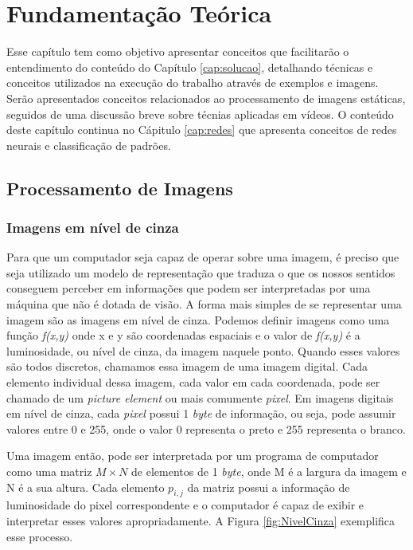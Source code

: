 \chapter{Fundamentação Teórica}\label{cap:fundament}



Esse capítulo tem como objetivo apresentar conceitos que facilitarão o entendimento do conteúdo do Capítulo \ref{cap:solucao}, detalhando técnicas e conceitos utilizados na execução do trabalho através de exemplos e imagens. Serão apresentados conceitos relacionados ao processamento de imagens estáticas, seguidos de uma discussão breve sobre técnias aplicadas em vídeos. O conteúdo deste capítulo continua no Cápitulo \ref{cap:redes} que apresenta conceitos de redes neurais e classificação de padrões. 

\section{Processamento de Imagens}\label{sec:processamento}

\subsection{Imagens em nível de cinza}

Para que um computador seja capaz de operar sobre uma imagem, é preciso que seja utilizado um modelo de representação que traduza o que os nossos sentidos conseguem perceber em informações que podem ser interpretadas por uma máquina que não é dotada de visão. A forma mais simples de se representar uma imagem são as imagens em nível de cinza. Podemos definir imagens como uma função \textit{f{(x,y)}} onde x e y são coordenadas espaciais e o valor de  \textit{f{(x,y)}} é a luminosidade, ou nível de cinza, da imagem naquele ponto. Quando esses valores são todos discretos, chamamos essa imagem de uma imagem digital\cite{gonzalez2009digital}. Cada elemento individual dessa imagem, cada valor em cada coordenada, pode ser chamado de um \textit{picture element} ou mais comumente \textit{pixel}. Em imagens digitais em nível de cinza, cada \textit{pixel} possui 1 \textit{byte} de informação, ou seja, pode assumir valores entre 0 e 255, onde o valor 0 representa o preto e 255 representa o branco. 

Uma imagem então, pode ser interpretada por um programa de computador como uma matriz $M\times N$ de elementos de 1 \textit{byte}, onde M é a largura da imagem e N é a sua altura. Cada elemento $p_{i,j}$ da matriz possui a informação de luminosidade do pixel correspondente e o computador é capaz de exibir e interpretar esses valores apropriadamente. A Figura \ref{fig:NivelCinza} exemplifica esse processo.

